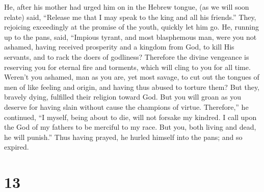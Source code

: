  He, after his mother had urged him on in the Hebrew tongue,
(as we will soon relate) said,  ``Release me that I may
speak to the king and all his friends.''  They, rejoicing
exceedingly at the promise of the youth, quickly let him go.
 He, running up to the pans, said,  ``Impious
tyrant, and most blasphemous man, were you not ashamed, having received
prosperity and a kingdom from God, to kill His servants, and to rack the
doers of godliness?  Therefore the divine vengeance is
reserving you for eternal fire and torments, which will cling to you for
all time.  Weren't you ashamed, man as you are, yet most
savage, to cut out the tongues of men of like feeling and origin, and
having thus abused to torture them?  But they, bravely
dying, fulfilled their religion toward God.  But you will
groan as you deserve for having slain without cause the champions of
virtue.  Therefore,'' he continued, ``I myself, being about
to die,  will not forsake my kindred.  I call
upon the God of my fathers to be merciful to my race.  But
you, both living and dead, he will punish.''  Thus having
prayed, he hurled himself into the pans; and so expired.

\hypertarget{section-12}{%
\section{13}\label{section-12}}

